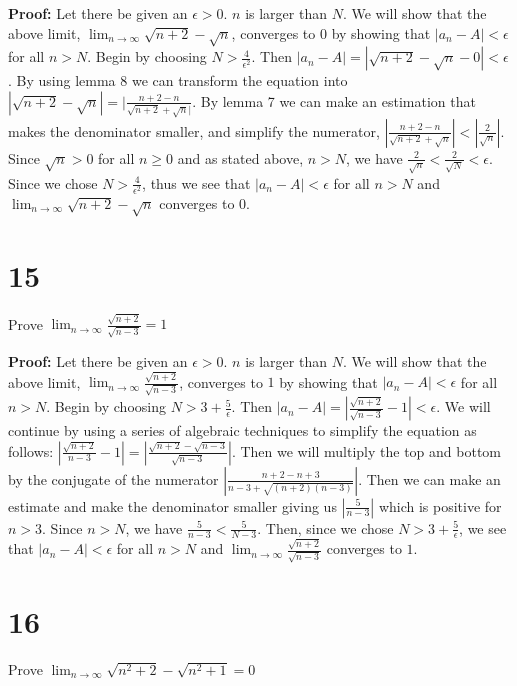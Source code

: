 \documentclass[12pt]{article}
\begin{document}
\bigskip

\textbf{Proof:} Let there be given an $\epsilon > 0$. $n$ is larger than $N$. We will show that the above limit, $\lim_{n\to \infty} \sqrt{n+2} - \sqrt{n}$, converges to $0$ by showing that $|a_n - A| < \epsilon$ for all $n > N$. Begin by choosing $N > \frac{4}{\epsilon^2}$. Then $|a_n - A| = | \sqrt{n+2} - \sqrt{n} - 0 | < \epsilon$. By using lemma 8 we can transform the equation into $| \sqrt{n+2} - \sqrt{n} | = |\frac{n + 2 - n}{\sqrt{n + 2} + {\sqrt{n}}|}$. By lemma 7 we can make an estimation that makes the denominator smaller, and simplify the numerator, $|\frac{n + 2 - n}{\sqrt{n + 2} + {\sqrt{n}}}| < |\frac{2}{\sqrt{n}}|$. Since $\sqrt{n} > 0$ for all $n\geq0$ and as stated above, $n > N$, we have $\frac{2}{\sqrt{n}} < \frac{2}{\sqrt{N}} < \epsilon$. Since we chose $N > \frac{4}{\epsilon^2}$, thus we see that $|a_n - A| < \epsilon$ for all $n > N$ and $\lim_{n\to \infty} \sqrt{n+2} - \sqrt{n}$ converges to $0$.

\section*{15}
Prove $\lim_{n\to \infty}\frac{\sqrt{n+2}}{\sqrt{n-3}} = 1$

\bigskip

\textbf{Proof:} Let there be given an $\epsilon > 0$. $n$ is larger than $N$. We will show that the above limit, $\lim_{n\to \infty}\frac{\sqrt{n+2}}{\sqrt{n-3}}$, converges to $1$ by showing that $|a_n - A| < \epsilon$ for all $n > N$. Begin by choosing $N > 3 + \frac{5}{\epsilon}$. Then $|a_n - A| = | \frac{\sqrt{n+2}}{\sqrt{n-3}} - 1 | < \epsilon$. We will continue by using a series of algebraic techniques to simplify the equation as follows: $|\frac{\sqrt{n+2}}{n-3} - 1| = |\frac{\sqrt{n+2}-\sqrt{n-3}}{\sqrt{n-3}}|$. Then we will multiply the top and bottom by the conjugate of the numerator $|\frac{n+2-n+3}{n-3+\sqrt{(n+2)(n-3)}}|$. Then we can make an estimate and make the denominator smaller giving us $|\frac{5}{n-3}|$ which is positive for $n>3$. Since $n > N$, we have $\frac{5}{n-3} < \frac{5}{N-3}$. Then, since we chose $N > 3 + \frac{5}{\epsilon}$, we see that $|a_n - A| < \epsilon$ for all $n > N$ and $\lim_{n\to \infty}\frac{\sqrt{n+2}}{\sqrt{n-3}}$ converges to $1$.

\bigskip

\section*{16}
Prove $\lim_{n\to \infty}\sqrt{n^2+2}-\sqrt{n^2+1} = 0$
\end{document}
